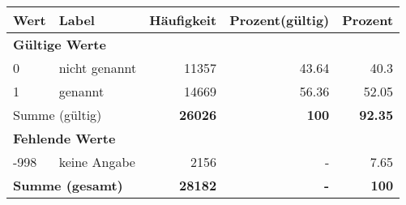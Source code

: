      \begin{longtable}{lXrrr}
     \toprule
     \textbf{Wert} & \textbf{Label} & \textbf{Häufigkeit} & \textbf{Prozent(gültig)} & \textbf{Prozent} \\
     \endhead
     \midrule
     \multicolumn{5}{l}{\textbf{Gültige Werte}}\\

     0 &
     \multicolumn{1}{X}{ nicht genannt   } &


       \num{11357} &
       \num[round-mode=places,round-precision=2]{43.64} &
         \num[round-mode=places,round-precision=2]{40.3} \\

     1 &
     \multicolumn{1}{X}{ genannt   } &


       \num{14669} &
       \num[round-mode=places,round-precision=2]{56.36} &
         \num[round-mode=places,round-precision=2]{52.05} \\
     \midrule
     \multicolumn{2}{l}{Summe (gültig)} &
       \textbf{\num{26026}} &
     \textbf{100} &
       \textbf{\num[round-mode=places,round-precision=2]{92.35}} \\
     \multicolumn{5}{l}{\textbf{Fehlende Werte}}\\
       -998 &
       keine Angabe &
         \num{2156} &
        - &
         \num[round-mode=places,round-precision=2]{7.65} \\
     \midrule
     \multicolumn{2}{l}{\textbf{Summe (gesamt)}} &
          \textbf{\num{28182}} &
        \textbf{-} &
        \textbf{100} \\
     \bottomrule
     \end{longtable}
     
